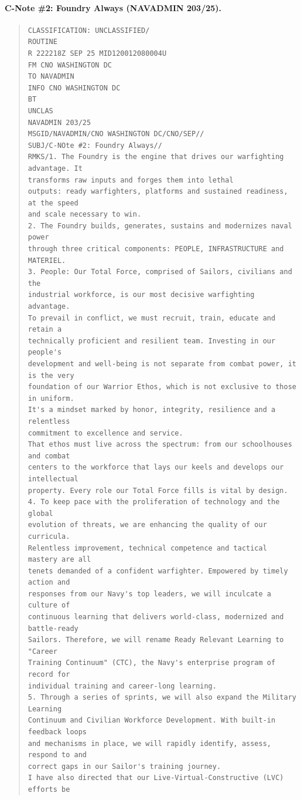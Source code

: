 \documentclass[../main.tex]{subfiles}
\begin{document}
\paragraph{C-Note \#2: Foundry Always (NAVADMIN 203/25).}
\begin{quote}\small\begin{verbatim}
CLASSIFICATION: UNCLASSIFIED/
ROUTINE
R 222218Z SEP 25 MID120012080004U
FM CNO WASHINGTON DC
TO NAVADMIN
INFO CNO WASHINGTON DC
BT
UNCLAS
NAVADMIN 203/25
MSGID/NAVADMIN/CNO WASHINGTON DC/CNO/SEP//
SUBJ/C-NOte #2: Foundry Always//
RMKS/1. The Foundry is the engine that drives our warfighting advantage. It
transforms raw inputs and forges them into lethal
outputs: ready warfighters, platforms and sustained readiness, at the speed
and scale necessary to win.
2. The Foundry builds, generates, sustains and modernizes naval power
through three critical components: PEOPLE, INFRASTRUCTURE and MATERIEL.
3. People: Our Total Force, comprised of Sailors, civilians and the
industrial workforce, is our most decisive warfighting advantage.
To prevail in conflict, we must recruit, train, educate and retain a
technically proficient and resilient team. Investing in our people's
development and well-being is not separate from combat power, it is the very
foundation of our Warrior Ethos, which is not exclusive to those in uniform.
It's a mindset marked by honor, integrity, resilience and a relentless
commitment to excellence and service.
That ethos must live across the spectrum: from our schoolhouses and combat
centers to the workforce that lays our keels and develops our intellectual
property. Every role our Total Force fills is vital by design.
4. To keep pace with the proliferation of technology and the global
evolution of threats, we are enhancing the quality of our curricula.
Relentless improvement, technical competence and tactical mastery are all
tenets demanded of a confident warfighter. Empowered by timely action and
responses from our Navy's top leaders, we will inculcate a culture of
continuous learning that delivers world-class, modernized and battle-ready
Sailors. Therefore, we will rename Ready Relevant Learning to "Career
Training Continuum" (CTC), the Navy's enterprise program of record for
individual training and career-long learning.
5. Through a series of sprints, we will also expand the Military Learning
Continuum and Civilian Workforce Development. With built-in feedback loops
and mechanisms in place, we will rapidly identify, assess, respond to and
correct gaps in our Sailor's training journey.
I have also directed that our Live-Virtual-Constructive (LVC) efforts be

\end{verbatim}
\end{quote}
\end{document}

